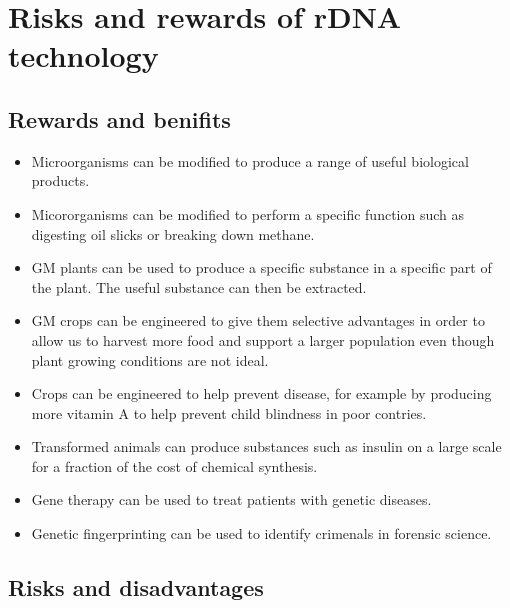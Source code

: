 \documentclass{article}
\begin{document}
\section*{Risks and rewards of rDNA technology}

\subsection*{Rewards and benifits}


\begin{itemize}
	
	\item Microorganisms can be modified to produce a range of useful biological
	products.

	\item Micororganisms can be modified to perform a specific function such as
	digesting oil slicks or breaking down methane.

	\item GM plants can be used to produce a specific substance in a specific
	part of the plant. The useful substance can then be extracted.

	\item GM crops can be engineered to give them selective advantages in order
	to allow us to harvest more food and support a larger population even though
	plant growing conditions are not ideal.

	\item Crops can be engineered to help prevent disease, for example by
	producing more vitamin A to help prevent child blindness in poor contries.

	\item Transformed animals can produce substances such as insulin on a large
	scale for a fraction of the cost of chemical synthesis.

	\item Gene therapy can be used to treat patients with genetic diseases.

	\item Genetic fingerprinting can be used to identify crimenals in forensic
	science.

\end{itemize}

\subsection*{Risks and disadvantages}
\end{document}
